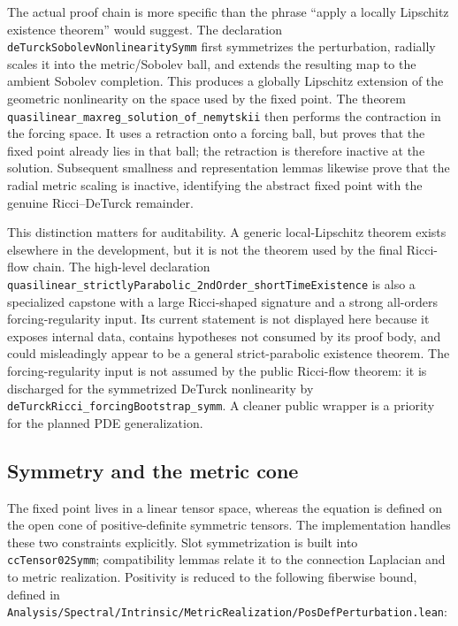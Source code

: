 \documentclass[11pt]{article}
\theoremstyle{plain}
\theoremstyle{definition}
\theoremstyle{remark}
\newcommand{\leanref}[1]{\nolinkurl{#1}}
\newcommand{\leanfile}[1]{\nolinkurl{#1}}
\newcommand{\rffile}[1]{\leanfile{#1}}
\begin{document}
The actual proof chain is more specific than the phrase ``apply a locally
Lipschitz existence theorem'' would suggest.  The declaration
\leanref{deTurckSobolevNonlinearitySymm} first symmetrizes the perturbation,
radially scales it into the metric/Sobolev ball, and extends the resulting
map to the ambient Sobolev completion.  This produces a globally Lipschitz
extension of the geometric nonlinearity on the space used by the fixed point.
The theorem
\leanref{quasilinear_maxreg_solution_of_nemytskii} then performs the contraction
in the forcing space.  It uses a retraction onto a forcing ball, but proves
that the fixed point already lies in that ball; the retraction is therefore
inactive at the solution.  Subsequent smallness and representation lemmas
likewise prove that the radial metric scaling is inactive, identifying the
abstract fixed point with the genuine Ricci--DeTurck remainder.

This distinction matters for auditability.  A generic local-Lipschitz theorem
exists elsewhere in the development, but it is not the theorem used by the
final Ricci-flow chain.  The high-level declaration
\leanref{quasilinear_strictlyParabolic_2ndOrder_shortTimeExistence} is also a
specialized capstone with a large Ricci-shaped signature and a strong
all-orders forcing-regularity input.  Its current statement is not displayed
here because it exposes internal data, contains hypotheses not consumed by
its proof body, and could misleadingly appear to be a general strict-parabolic
existence theorem.  The forcing-regularity input is not assumed by the public
Ricci-flow theorem: it is discharged for the symmetrized DeTurck nonlinearity
by \leanref{deTurckRicci_forcingBootstrap_symm}.  A cleaner public wrapper is a
priority for the planned PDE generalization.

\subsection{Symmetry and the metric cone}
\label{subsec:short-time-metric-realization}

The fixed point lives in a linear tensor space, whereas the equation is
defined on the open cone of positive-definite symmetric tensors.  The
implementation handles these two constraints explicitly.  Slot
symmetrization is built into \leanref{ccTensor02Symm}; compatibility lemmas
relate it to the connection Laplacian and to metric realization.  Positivity
is reduced to the following fiberwise bound, defined in
\rffile{Analysis/Spectral/Intrinsic/MetricRealization/PosDefPerturbation.lean}:
\end{document}
